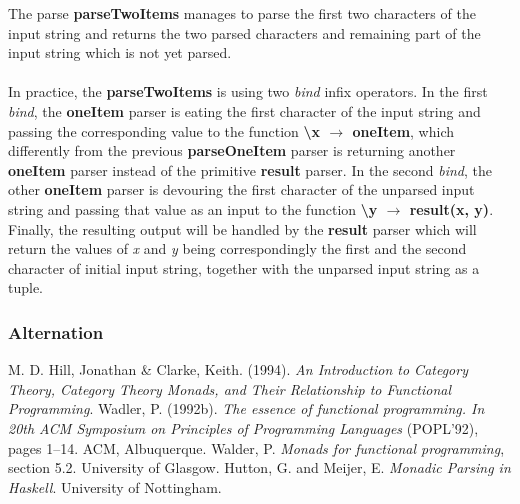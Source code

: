\documentclass[a4paper, onecolumn]{article}
\begin{document}
    The parse \textbf{parseTwoItems} manages to parse the first two characters of the input string and returns the two parsed characters and remaining part of the input string which is not yet parsed. \\ \\
    In practice, the \textbf{parseTwoItems} is using two \textit{bind} infix operators. In the first \textit{bind}, the \textbf{oneItem} parser is eating the first character of the input string and passing the corresponding value to the function \textbf{\textbackslash x $\rightarrow$ oneItem}, which differently from the previous \textbf{parseOneItem} parser is returning another \textbf{oneItem} parser instead of the primitive \textbf{result} parser. In the second \textit{bind}, the  other \textbf{oneItem} parser is devouring the first character of the unparsed input string and passing that value as an input to the function \textbf{\textbackslash y $\rightarrow$ result(x, y)}. Finally, the resulting output will be handled by the \textbf{result} parser which will return the values of \textit{x} and \textit{y} being correspondingly the first and the second character of initial input string, together with the unparsed input string as a tuple.
    \subsubsection{Alternation}
    
    \begin{thebibliography}{9}
    M. D. Hill, Jonathan & Clarke, Keith. (1994). \textit{An Introduction to Category Theory, Category Theory Monads, and Their Relationship to Functional Programming}.
    Wadler, P. (1992b). \textit{The essence of functional programming. In
    20th ACM Symposium on Principles of Programming Languages}
    (POPL’92), pages 1–14. ACM, Albuquerque.
    Walder, P. \textit{Monads for functional programming}, section 5.2. University of Glasgow. 
    Hutton, G. and Meijer, E. \textit{Monadic Parsing in Haskell}. University of Nottingham.
    \end{thebibliography}
    
\end{document}
